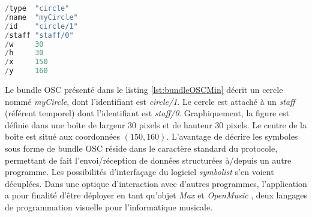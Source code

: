 \begin{lstlisting}[language=java, 
				   caption={Messages OSC \'{e}l\'{e}mentaires pour les symboles d'une partition \textit{symbolist}}, 
				   label={lst:bundleOSCMin}, 
				   captionpos={b}, 
				   numbers=none]
/type  "circle"
/name  "myCircle"
/id    "circle/1"
/staff "staff/0"
/w     30
/h     30
/x     150
/y     160 
\end{lstlisting}

Le bundle OSC présenté dans le listing \ref{lst:bundleOSCMin} décrit un cercle nommé \textit{myCircle}, dont l'identifiant est \textit{circle/1}. Le cercle est attaché à un \textit{staff} (référent temporel) dont l'identifiant est \textit{staff/0}. Graphiquement, la figure est définie dans une boîte de largeur 30 pixels et de hauteur 30 pixels. Le centre de la boîte est situé aux coordonnées $(150, 160)$.
L'avantage de décrire les symboles sous forme de bundle OSC réside dans le caractère standard du protocole, permettant de fait l'envoi/réception de données structurées à/depuis un autre programme. Les possibilités d'interfaçage du logiciel \textit{symbolist} s'en voient décuplées.
Dans une optique d'interaction avec d'autres programmes, l'application a pour finalité d'être déployer en tant qu'objet \textit{Max} \cite{puckette1991} et \textit{OpenMusic} \cite{agon1998}, deux langages de programmation visuelle pour l'informatique musicale.